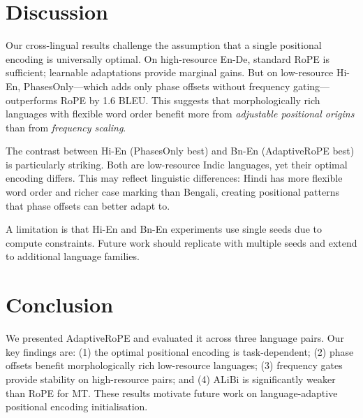 \documentclass[conference]{IEEEtran}
\begin{document}
\section{Discussion}

Our cross-lingual results challenge the assumption that a single positional
encoding is universally optimal. On high-resource En-De, standard RoPE is
sufficient; learnable adaptations provide marginal gains. But on low-resource
Hi-En, PhasesOnly---which adds only phase offsets without frequency gating---
outperforms RoPE by 1.6 BLEU. This suggests that morphologically rich languages
with flexible word order benefit more from \emph{adjustable positional origins}
than from \emph{frequency scaling}.

The contrast between Hi-En (PhasesOnly best) and Bn-En (AdaptiveRoPE best)
is particularly striking. Both are low-resource Indic languages, yet their
optimal encoding differs. This may reflect linguistic differences: Hindi has
more flexible word order and richer case marking than Bengali, creating
positional patterns that phase offsets can better adapt to.

A limitation is that Hi-En and Bn-En experiments use single seeds due to
compute constraints. Future work should replicate with multiple seeds and
extend to additional language families.

\section{Conclusion}

We presented AdaptiveRoPE and evaluated it across three language pairs. Our
key findings are: (1) the optimal positional encoding is task-dependent;
(2) phase offsets benefit morphologically rich low-resource languages;
(3) frequency gates provide stability on high-resource pairs; and
(4) ALiBi is significantly weaker than RoPE for MT. These results motivate
future work on language-adaptive positional encoding initialisation.



\end{document}
